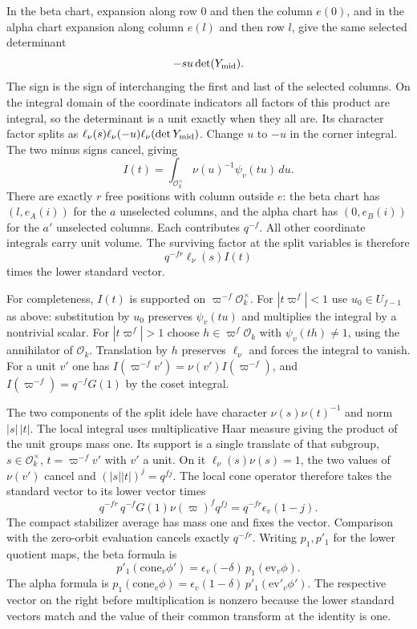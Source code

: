 In the beta chart, expansion along row \(0\) and then the column
\(e(0)\), and in the alpha chart expansion along column \(e(l)\)
and then row \(l\), give the same selected determinant
\[
                          -su\det(Y_{\rm mid}).
\]
The sign is the sign of interchanging the first and last of the
selected columns. On the integral domain of the coordinate
indicators all factors of this product are integral, so the
determinant is a unit exactly when they all are. Its character
factor splits as
\(\ell_\nu(s)\ell_\nu(-u)\ell_\nu(\det Y_{\rm mid})\).
Change \(u\) to \(-u\) in the corner integral. The two minus signs
cancel, giving
\[
       I(t)=\int_{\mathcal O_k^\times}\nu(u)^{-1}\psi_v(tu)\,du .
\]
There are exactly \(r\) free positions with column outside \(e\):
the beta chart has \((l,e_A(i))\) for the \(a\) unselected columns, and the alpha chart
has \((0,e_B(i))\) for the \(a'\) unselected columns.
Each contributes \(q^{-f}\). All other coordinate integrals carry
unit volume. The surviving factor at the split variables is
therefore
\[
                       q^{-fr}\ell_\nu(s) I(t)
\]
times the lower standard vector.

For completeness, \(I(t)\) is supported on
\(\varpi^{-f}\mathcal O_k^\times\). For
\(|t\varpi^f|<1\) use \(u_0\in U_{f-1}\) as above: substitution
by \(u_0\) preserves \(\psi_v(tu)\) and multiplies the integral
by a nontrivial scalar. For \(|t\varpi^f|>1\) choose
\(h\in\varpi^f\mathcal O_k\) with \(\psi_v(th)\ne1\), using the
annihilator of \(\mathcal O_k\). Translation by \(h\) preserves
\(\ell_\nu\) and forces the integral to vanish. For a unit \(v'\)
one has \(I(\varpi^{-f}v')=\nu(v')I(\varpi^{-f})\), and
\(I(\varpi^{-f})=q^{-f}G(1)\) by the coset integral.

The two components of the split idele have character
\(\nu(s)\nu(t)^{-1}\) and norm \(|s|\,|t|\). The local integral
uses multiplicative Haar measure giving the product of the unit
groups mass one. Its support is a single translate of that subgroup,
\(s\in\mathcal O_k^\times\), \(t=\varpi^{-f}v'\) with \(v'\) a
unit. On it \(\ell_\nu(s)\nu(s)=1\), the two values of \(\nu(v')\)
cancel and \((|s||t|)^j=q^{fj}\). The local cone operator therefore
takes the standard vector to its lower vector times
\[
 q^{-fr}\, q^{-f}G(1)\nu(\varpi)^f q^{fj}
                  =q^{-fr}\epsilon_v(1-j).
\]
The compact stabilizer average has mass one and fixes the vector.
Comparison with the zero-orbit evaluation cancels exactly \(q^{-fr}\).
Writing \(p_1,p'_1\) for the lower quotient maps, the beta formula is
\[
 p'_1(\mathrm{cone}_v\phi')=\epsilon_v(-\delta)\,
                                p_1(\mathrm{ev}_v\phi).
\]
The alpha formula is
\(p_1(\mathrm{cone}_v\phi)=\epsilon_v(1-\delta)\,
p'_1(\mathrm{ev}'_v\phi')\). The respective vector on the right
before multiplication is nonzero because the lower standard vectors
match and the value of their common transform at the identity is one.

